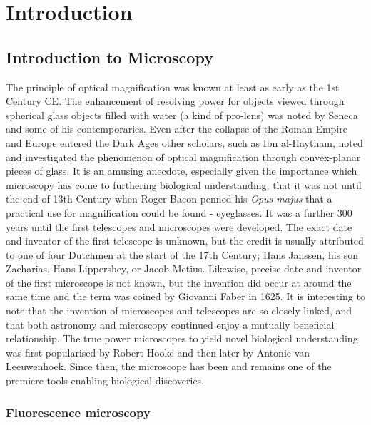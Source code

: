 \chapter{Introduction}

\section{Introduction to Microscopy}
\label{sec:microscopy}

The principle of optical magnification was known at least as early 
as the 1st Century CE. The enhancement of resolving power for 
objects viewed through spherical glass objects filled with water 
(a kind of pro-lens) was noted by Seneca and some of his 
contemporaries\cite{seneca1971naturales}. Even after the collapse 
of the Roman Empire and Europe entered the Dark Ages other scholars, 
such as Ibn al-Haytham, noted and investigated the phenomenon of 
optical magnification through convex-planar pieces of 
glass\cite{nasr1968science}. It is an amusing anecdote, especially 
given the importance which microscopy has come to furthering 
biological understanding, that it was not until the end of 13th 
Century  when Roger Bacon penned his \textit{Opus majus} that a 
practical use for magnification could be found - eyeglasses. It 
was a further 300 years until the first telescopes and microscopes 
were developed. The exact date and inventor of the first telescope 
is unknown, but the credit is usually attributed to one of four 
Dutchmen at the start of the 17th Century; Hans Janssen, his son 
Zacharias, Hans Lippershey, or Jacob Metius. Likewise, precise date 
and inventor of the first microscope is not known, but the invention 
did occur at around the same time and the term was coined by Giovanni 
Faber in 1625\cite{bardell2004invention}. It is interesting to note 
that the invention of microscopes and telescopes are so closely linked, 
and that both astronomy and microscopy continued enjoy a mutually 
beneficial relationship. The true power microscopes to yield novel 
biological understanding was first popularised by Robert Hooke and then
later by Antonie van 
Leeuwenhoek\cite{hooke1665micrographia, chung2017pioneers}. Since then, 
the microscope has been and remains one of the premiere tools enabling 
biological discoveries.

\subsection{Fluorescence microscopy}
\label{subsec:fluorescence}

